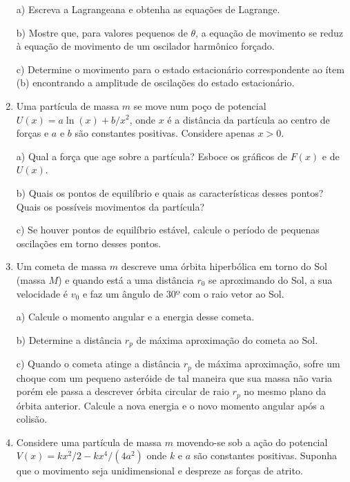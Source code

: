 \begin{enumerate}[start=1,label={\bfseries Q\arabic*.}]
a) Escreva a Lagrangeana e obtenha as equações de Lagrange.

\resposta

b) Mostre que, para valores pequenos de $\theta$, a equação de movimento se reduz à equação de movimento de um oscilador harmônico forçado.

\resposta

c) Determine o movimento para o estado estacionário correspondente ao ítem (b) encontrando a amplitude de oscilações do estado estacionário.

\resposta


\item Uma partícula de massa $m$ se move num poço de potencial $U(x) = a \operatorname{ln}(x) + b/x^{2}$, onde $x$ é a distância da partícula ao centro de forças e $a$ e $b$ são constantes positivas. Considere apenas $x > 0$.

a) Qual a força que age sobre a partícula? Esboce os gráficos de $F(x)$ e de $U(x)$.

\resposta

b) Quais os pontos de equilíbrio e quais as características desses pontos? Quais os possíveis movimentos da partícula?

\resposta

c) Se houver pontos de equilíbrio estável, calcule o período de pequenas oscilações em torno desses pontos.

\resposta


\item Um cometa de massa $m$ descreve uma órbita hiperbólica em torno do Sol (massa $M$) e quando está a uma distância $r_{0}$ se aproximando do Sol, a sua velocidade é $v_{0}$ e faz um ângulo de $30º$ com o raio vetor ao Sol.

a) Calcule o momento angular e a energia desse cometa.

\resposta

b) Determine a distância $r_{p}$ de máxima aproximação do cometa ao Sol.

\resposta

c) Quando o cometa atinge a distância $r_{p}$ de máxima aproximação, sofre um choque com um pequeno asteróide de tal maneira que sua massa não varia porém ele passa a descrever órbita circular de raio $r_{p}$ no mesmo plano da órbita anterior. Calcule a nova energia e o novo momento angular após a colisão.

\resposta



\item Considere uma partícula de massa $m$ movendo-se sob a ação do potencial $V (x) = k x^{2}/2 - kx^{4}/(4a^{2})$ onde $k$ e $a$ são constantes positivas. Suponha que o movimento seja unidimensional e despreze as forças de atrito.


\end{enumerate}
